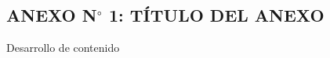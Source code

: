 \medspace
\vspace{1.5cm}
\begin{center}
	\section*{ANEXO N$^\circ$ 1: TÍTULO DEL ANEXO}
\end{center}

\vspace{1cm}

Desarrollo de contenido